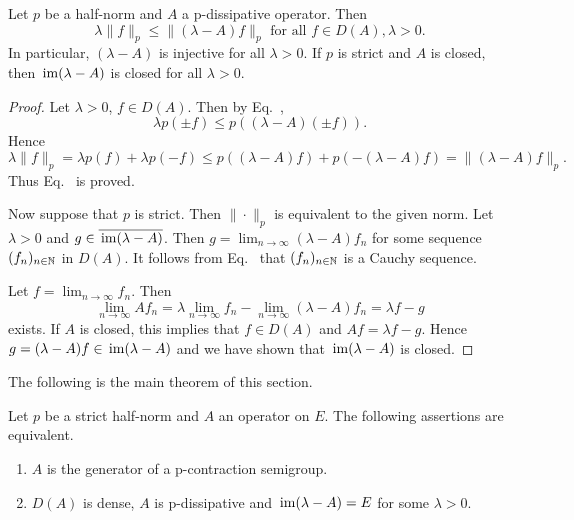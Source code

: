 \begin{lemma}\label{lem:a2-2.10}
Let $p$ be a half-norm and $A$ a p-dissipative operator.
Then
\begin{equation}\label{eq:a2-2.14}
\lambda\|f\|_{p} \leq \|(\lambda - A)f\|_{p} \text{ for all } f \in D(A), \lambda > 0.
\end{equation}
In particular, $(\lambda-A)$ is injective for all $\lambda > 0$.
If\/ $p$ is strict and $A$ is closed, then $\mathop{}\mathrm{im}(\lambda - A)$ is closed for all $\lambda > 0$.
\end{lemma}
\begin{proof}
Let $\lambda > 0$, $f \in D(A)$.
Then by Eq.~, 
%
\[
	\lambda p(\pm f) \leq p((\lambda - A)(\pm f)) .
\]
%
Hence 
\[
\lambda \|f\|_{p} = \lambda p(f) + \lambda p(-f) \leq p((\lambda - A)f) + p(-(\lambda-A)f) = \|(\lambda-A)f\|_{p}.
\]
Thus Eq.~ is proved.

Now suppose that $p$ is strict.
Then $\|\cdot\|_{p}$ is equivalent to the given norm.
Let $\lambda > 0$ and $g \in \overline{\mathop{}\mathrm{im}(\lambda - A)}$.
Then $g = \lim_{n\to\infty} (\lambda - A)f_{n}$ for some sequence $(f_{n})_{n \in \mathbb{N}} $ in $D(A)$.
It follows from Eq.~ that $(f_{n})_{n\in\mathbb{N}}$ is a Cauchy sequence.

Let $f = \lim_{n\to\infty} f_{n}$.
Then 
\[
\lim_{n\to\infty} Af_{n} 
= \lambda\lim_{n\to\infty} f_{n} - \lim_{n\to\infty} (\lambda - A)f_{n} = \lambda f - g
\]
exists.
If\/ $A$ is closed, this implies that $f \in D(A)$ and $Af = \lambda f - g$.
Hence $g = (\lambda - A)f \in \mathop{}\mathrm{im}(\lambda - A)$ and we have shown that $\mathop{}\mathrm{im}(\lambda - A)$ is closed.
\end{proof}
The following is the main theorem of this section.
\begin{theorem}\label{thm:a2-2.11}
Let $p$ be a strict half-norm and $A$ an operator on $E$.
The following assertions are equivalent.
\begin{enumerate}[\upshape (a)]
\item \label{thm:a2-2.11.1}
$A$ is the generator of a p-contraction semigroup.
\item \label{thm:a2-2.11.2}
$D(A)$ is dense, $A$ is p-dissipative and $\mathop{}\mathrm{im}(\lambda - A) = E$ for some $\lambda > 0$.
\end{enumerate}
\end{theorem}
